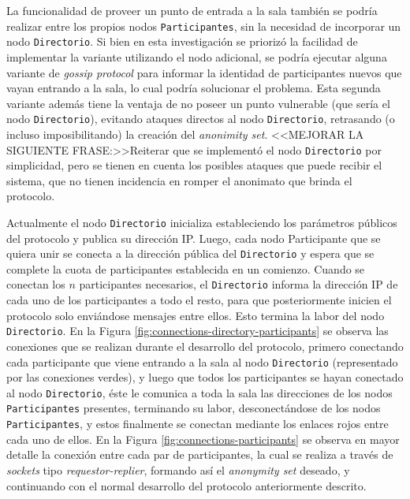 La funcionalidad de proveer un punto de entrada a la sala también se podría 
realizar entre los propios nodos \texttt{Participantes}, sin la necesidad de 
incorporar un nodo \texttt{Directorio}. Si bien en esta investigación se 
priorizó la facilidad de implementar la variante utilizando el nodo adicional, 
se podría ejecutar alguna variante de \emph{gossip protocol} 
\cite{Demers:1987:EAR:41840.41841} para informar la identidad de participantes 
nuevos que vayan entrando a la sala, lo cual podría solucionar el problema. 
Esta segunda variante además tiene la ventaja de no poseer un punto vulnerable 
(que sería el nodo \texttt{Directorio}), evitando ataques directos al nodo 
\texttt{Directorio}, retrasando (o incluso imposibilitando) la 
creación del \emph{anonimity set}. 
<<MEJORAR LA SIGUIENTE FRASE:>>Reiterar que se implementó el nodo 
\texttt{Directorio} por simplicidad, pero se tienen en cuenta los posibles 
ataques que puede recibir el sistema, que no tienen incidencia en romper el 
anonimato que brinda el protocolo.

Actualmente el nodo \texttt{Directorio} inicializa estableciendo los 
parámetros públicos del protocolo y publica su dirección IP. Luego, cada nodo 
Participante que se quiera unir se conecta a la dirección pública del 
\texttt{Directorio} y espera que se complete la cuota de participantes 
establecida en un comienzo. Cuando se conectan los $n$ participantes 
necesarios, el \texttt{Directorio} informa la dirección IP de cada uno de los 
participantes a todo el resto, para que posteriormente inicien el protocolo 
solo enviándose mensajes entre ellos. Esto termina la labor del nodo 
\texttt{Directorio}. En la Figura \ref{fig:connections-directory-participants} 
se observa las conexiones que se realizan durante el desarrollo del protocolo, 
primero conectando cada participante que viene entrando a la sala al nodo 
\texttt{Directorio} (representado por las conexiones verdes), y luego que 
todos los participantes se hayan conectado al nodo \texttt{Directorio}, éste 
le comunica a toda la sala las direcciones de los nodos \texttt{Participantes} 
presentes, terminando su labor, desconectándose de los nodos 
\texttt{Participantes}, y estos finalmente se conectan mediante los enlaces 
rojos entre cada uno de ellos. En la Figura \ref{fig:connections-participants} 
se observa en mayor detalle la conexión entre cada par de participantes, la 
cual se realiza a través de \emph{sockets} tipo \emph{requestor-replier}, 
formando así el \emph{anonymity set} deseado, y continuando con el normal 
desarrollo del protocolo anteriormente descrito.

